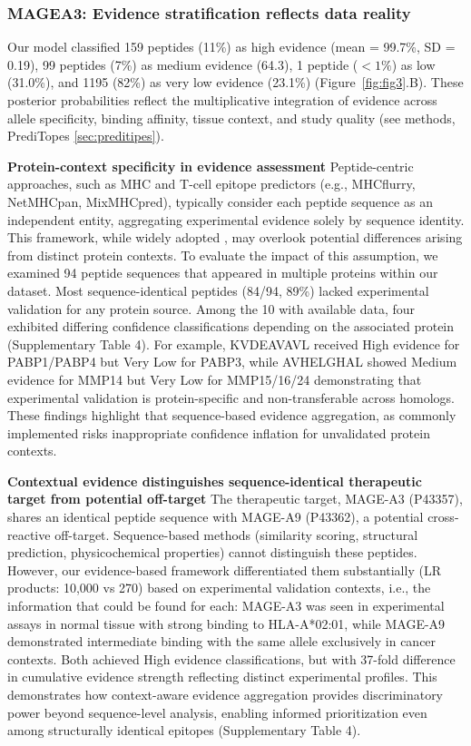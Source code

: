 \documentclass[unnumsec,webpdf,contemporary,large]{oup-authoring-template}%
\theoremstyle{thmstyleone}%
\theoremstyle{thmstyletwo}%
\theoremstyle{thmstylethree}%
\begin{document}
        
        \subsubsection{\textbf{MAGEA3: Evidence stratification reflects data reality}}

        Our model classified 159 peptides (11\%) as high evidence (mean = 99.7\%, SD = 0.19), 99 peptides (7\%) as medium evidence (64.3), 1 peptide ($< 1\%$) as low (31.0\%), and 1195 (82\%) as very low evidence (23.1\%) (Figure~\ref{fig:fig3}.B). These posterior probabilities reflect the multiplicative integration of evidence across allele specificity, binding affinity, tissue context, and study quality (see methods, PrediTopes \ref{sec:preditipes}). 
   
        \textbf{Protein-context specificity in evidence assessment}
        Peptide-centric approaches, such as MHC and T-cell epitope predictors (e.g., MHCflurry, NetMHCpan, MixMHCpred), typically consider each peptide sequence as an independent entity, aggregating experimental evidence solely by sequence identity. This framework, while widely adopted \cite{gfeller2023contemplating, reynisson2020netmhcpan}, may overlook potential differences arising from distinct protein contexts. To evaluate the impact of this assumption, we examined 94 peptide sequences that appeared in multiple proteins within our dataset. Most sequence-identical peptides (84/94, 89\%) lacked experimental validation for any protein source. Among the 10 with available data, four exhibited differing confidence classifications depending on the associated protein (Supplementary Table 4).
        For example, KVDEAVAVL received High evidence for PABP1/PABP4 but Very Low for PABP3, while AVHELGHAL showed Medium evidence for MMP14 but Very Low for MMP15/16/24 demonstrating that experimental validation is protein-specific and non-transferable across homologs.
        These findings highlight that sequence-based evidence aggregation, as commonly implemented risks inappropriate confidence inflation for unvalidated protein contexts.
        
        \textbf{Contextual evidence distinguishes sequence-identical therapeutic target from potential off-target}
        The therapeutic target, MAGE-A3 (P43357), shares an identical peptide sequence with MAGE-A9 (P43362), a potential cross-reactive off-target. Sequence-based methods (similarity scoring, structural prediction, physicochemical properties) cannot distinguish these peptides. However, our evidence-based framework differentiated them substantially (LR products: 10,000 vs 270) based on experimental validation contexts, i.e., the information that could be found for each: MAGE-A3 was seen in experimental assays in normal tissue with strong binding to HLA-A*02:01, while MAGE-A9 demonstrated intermediate binding with the same allele exclusively in cancer contexts. Both achieved High evidence classifications, but with 37-fold difference in cumulative evidence strength reflecting distinct experimental profiles. This demonstrates how context-aware evidence aggregation provides discriminatory power beyond sequence-level analysis, enabling informed prioritization even among structurally identical epitopes (Supplementary Table 4).
    
\end{document}
